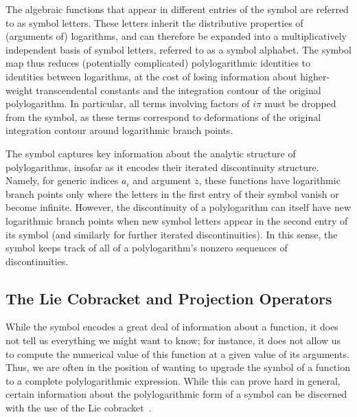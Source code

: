 \documentclass[11pt]{article}
\begin{document}
The algebraic functions that appear in different entries of the symbol are referred to as symbol letters. These letters inherit the distributive properties of (arguments of) logarithms, and can therefore be expanded into a multiplicatively independent basis of symbol letters, referred to as a symbol alphabet. The symbol map thus reduces (potentially complicated) polylogarithmic identities to identities between logarithms, at the cost of losing information about higher-weight transcendental constants and the integration contour of the original polylogarithm. In particular, all terms involving factors of $i\pi$ must be dropped from the symbol, as these terms correspond to deformations of the original integration contour around logarithmic branch points.
 
The symbol captures key information about the analytic structure of polylogarithms, insofar as it encodes their iterated discontinuity structure. Namely, for generic indices $a_i$ and argument $z$, these functions have logarithmic branch points only where the letters in the first entry of their symbol vanish or become infinite. However, the discontinuity of a polylogarithm can itself have new logarithmic branch points when new symbol letters appear in the second entry of its symbol (and similarly for further iterated discontinuities). In this sense, the symbol keeps track of all of a polylogarithm's nonzero sequences of discontinuities. 

\subsection{The Lie Cobracket and Projection Operators}
\label{sec:lie_cobracket}

While the symbol encodes a great deal of information about a function, it does not tell us everything we might want to know; for instance, it does not allow us to compute the numerical value of this function at a given value of its arguments. Thus, we are often in the position of wanting to upgrade the symbol of a function to a complete polylogarithmic expression. While this can prove hard in general, certain information about the polylogarithmic form of a symbol can be discerned with the use of the Lie cobracket~\cite{Golden:2013xva}. 
\end{document}
